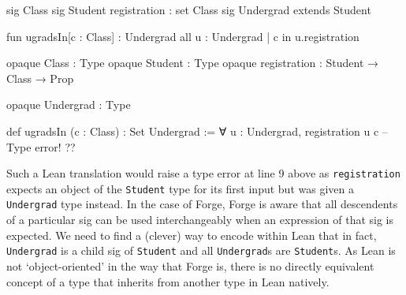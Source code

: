 \vspace{0.5em}
\noindent\begin{minipage}{0.5\textwidth}
\begin{forge}
sig Class {}
sig Student {
  registration : set Class
}
sig Undergrad extends Student {}

fun ugradsIn[c : Class] : Undergrad {
  all u : Undergrad |
    c in u.registration
}
\end{forge}
\end{minipage}%
\begin{minipage}{0.5\textwidth}
\begin{lean*}
opaque Class : Type
opaque Student : Type
opaque registration : Student → Class → Prop

opaque Undergrad : Type

def ugradsIn (c : Class) : Set Undergrad :=
  ∀ u : Undergrad, 
    registration u c -- Type error!
?\phantom{}?
\end{lean*}
\end{minipage}
\vspace{0.5em}

Such a Lean translation would raise a type error at line 9 above as \texttt{registration} expects an object of the \texttt{Student} type for its first input but was given a \texttt{Undergrad} type instead. In the case of Forge, Forge is aware that all descendents of a particular sig can be used interchangeably when an expression of that sig is expected. We need to find a (clever) way to encode within Lean that in fact, \texttt{Undergrad} is a child sig of \texttt{Student} and all \texttt{Undergrad}s are \texttt{Student}s. As Lean is not `object-oriented' in the way that Forge is, there is no directly equivalent concept of a type that inherits from another type in Lean natively. 

